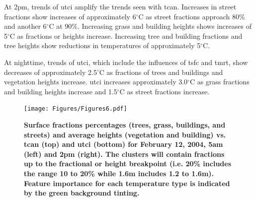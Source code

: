 \documentclass[final,3p,times,authoryear]{elsarticle}
\begin{document}
At 2pm, trends of \gls{utci} amplify the trends seen with \gls{tcan}. Increases in street fractions show increases of approximately 6$^{\circ}$C as street fractions approach 80\% and another 6$^{\circ}$C at 90\%. Increasing grass and building heights shows increases of 5$^{\circ}$C as fractions or heights increase. Increasing tree and building fractions and tree heights show reductions in temperatures of approximately 5$^{\circ}$C.

At nighttime, trends of \gls{utci}, which include the influences of \gls{tsfc} and \gls{tmrt}, show decreases of approximately 2.5$^{\circ}$C as fractions of trees and buildings and vegetation heights increase. \gls{utci} increases approximately 3.0$^{\circ}$C as grass fractions and building heights increase and 1.5$^{\circ}$C as street fractions increase.



\begin{figure}
\centering
\texttt{[image: Figures/Figures6.pdf]}
\caption{\bf Surface fractions percentages (trees, grass, buildings, and streets) and average heights (vegetation and building) vs. \gls{tcan} (top) and \gls{utci} (bottom) for February 12, 2004, 5am (left) and 2pm (right). The clusters will contain fractions up to the fractional or height breakpoint (i.e. 20\% includes the range 10 to 20\%  while 1.6m includes 1.2 to 1.6m). Feature importance for each temperature type is indicated by the green background tinting.}
 \label{fig:box5a} \label{fig:box14a}
\end{figure} 



\end{document}
